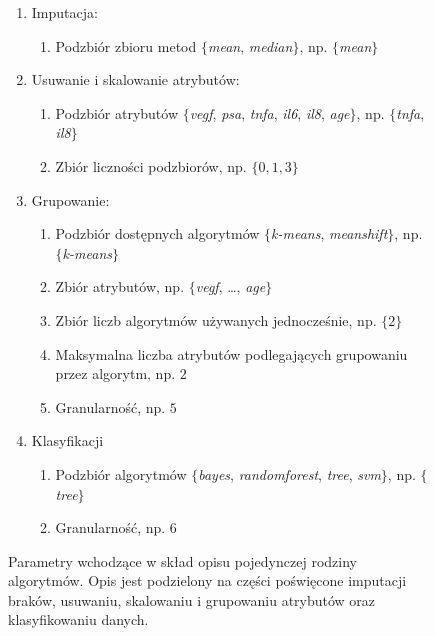 \documentclass[../thesis.tex]{subfiles}
\begin{document}
\begin{figure}[h]
\centering
\begin{framed}
  \begin{enumerate}
    \item Imputacja: 
    \begin{enumerate}
      \item Podzbiór zbioru metod $\{$\emph{mean}, \emph{median}$\}$, np. $\{$\emph{mean}$\}$
    \end{enumerate}
    \item Usuwanie i skalowanie atrybutów:
    \begin{enumerate}
      \item Podzbiór atrybutów $\{$\emph{vegf}, \emph{psa}, \emph{tnfa}, \emph{il6}, \emph{il8}, \emph{age}$\}$, np. $\{$\emph{tnfa}, \emph{il8}$\}$
      \item Zbiór liczności podzbiorów, np. $\{0, 1, 3\}$
    \end{enumerate}
    \item Grupowanie:
    \begin{enumerate}
      \item Podzbiór dostępnych algorytmów $\{$\emph{k-means}, \emph{meanshift}$\}$, np. $\{$\emph{k-means}$\}$
      \item Zbiór atrybutów, np. $\{$\emph{vegf}, \ldots, \emph{age}$\}$
      \item Zbiór liczb algorytmów używanych jednocześnie, np. $\{2\}$
      \item Maksymalna liczba atrybutów podlegających grupowaniu przez algorytm, np. $2$
      \item Granularność, np. $5$
    \end{enumerate}
    \item Klasyfikacji
    \begin{enumerate}
      \item Podzbiór algorytmów $\{$\emph{bayes}, \emph{randomforest}, \emph{tree}, \emph{svm}$\}$, np. $\{$\emph{tree}$\}$
      \item Granularność, np. $6$
    \end{enumerate}
  \end{enumerate}
\end{framed}
\caption{Parametry wchodzące w skład opisu pojedynczej rodziny algorytmów. Opis jest podzielony na części poświęcone imputacji braków, usuwaniu, skalowaniu i grupowaniu atrybutów oraz klasyfikowaniu danych.}
\label{req:as}
\end{figure}
\end{document}
